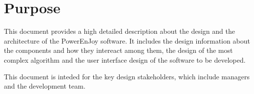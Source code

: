 \section{Purpose}
This document provides a high detailed description about the design and the architecture of the PowerEnJoy software.
It includes the design information about the components and how they intereact among them, the design of the most complex algorithm and the user interface design of the software to be developed.

This document is inteded for the key design stakeholders, which include managers and the development team.
